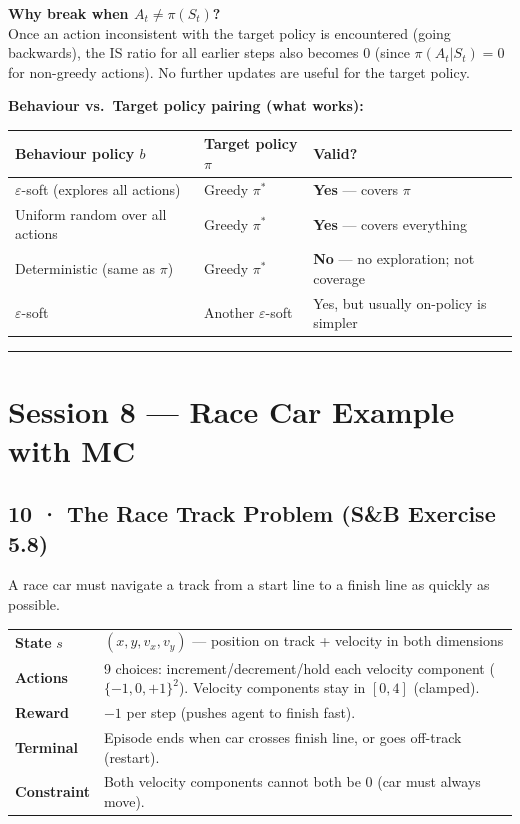\documentclass[11pt,a4paper]{article}
\begin{document}
\textbf{Why break when $A_t \neq \pi(S_t)$?}\\
Once an action inconsistent with the target policy is encountered (going backwards), the IS ratio
for all earlier steps also becomes 0 (since $\pi(A_t|S_t) = 0$ for non-greedy actions).
No further updates are useful for the target policy.

\textbf{Behaviour vs.\ Target policy pairing (what works):}
\begin{center}\small
\begin{tabular}{p{5cm}p{4cm}p{4.5cm}}
\toprule
\textbf{Behaviour policy $b$} & \textbf{Target policy $\pi$} & \textbf{Valid?} \\
\midrule
$\varepsilon$-soft (explores all actions) & Greedy $\pi^*$ & \textbf{Yes} — covers $\pi$ \\
Uniform random over all actions & Greedy $\pi^*$ & \textbf{Yes} — covers everything \\
Deterministic (same as $\pi$) & Greedy $\pi^*$ & \textbf{No} — no exploration; not coverage \\
$\varepsilon$-soft & Another $\varepsilon$-soft & Yes, but usually on-policy is simpler \\
\bottomrule
\end{tabular}
\end{center}

\hrule\vspace{8pt}

\section*{Session 8 — Race Car Example with MC}

\subsection*{10 · The Race Track Problem (S\&B Exercise 5.8)}

\begin{tcolorbox}[defn={Problem Setup}]
A race car must navigate a track from a start line to a finish line as quickly as possible.

\medskip
\begin{tabular}{p{2.5cm}p{11cm}}
\textbf{State} $s$ & $(x, y, v_x, v_y)$ — position on track + velocity in both dimensions \\
\textbf{Actions} & 9 choices: increment/decrement/hold each velocity component ($\{-1,0,+1\}^2$).
  Velocity components stay in $[0, 4]$ (clamped). \\
\textbf{Reward} & $-1$ per step (pushes agent to finish fast). \\
\textbf{Terminal} & Episode ends when car crosses finish line, or goes off-track (restart). \\
\textbf{Constraint} & Both velocity components cannot both be 0 (car must always move). \\
\end{tabular}
\end{tcolorbox}
\end{document}
